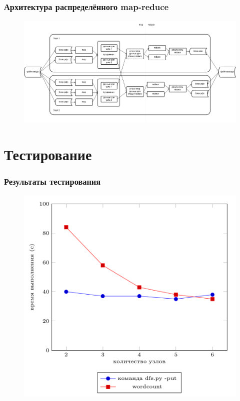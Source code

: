 \documentclass[utf8]{beamer}
\begin{document}
    \begin{frame}
    \frametitle{Архитектура распределённого map-reduce}
        \begin{figure}[h!]
            \centering
            \includegraphics[scale=0.25]{map_reduce_framework.png}
        \end{figure}        
    \end{frame}

\section{Тестирование}
    \begin{frame}
    \frametitle{Результаты тестирования}
        \begin{figure}[h!]
            \centering
            \includegraphics[scale=0.23]{test1.png}
        \end{figure}        
    \end{frame}
\end{document}
